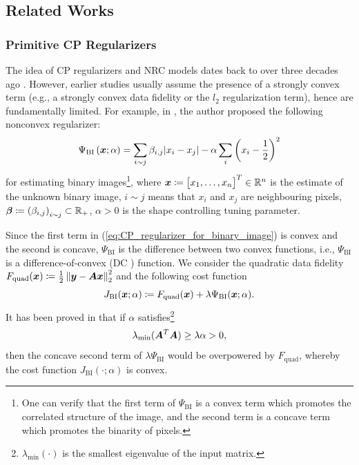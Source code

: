 \documentclass[lettersize,journal]{IEEEtran}
\theoremstyle{plain}%
\theoremstyle{definition}
\theoremstyle{remark}
\begin{document}
\subsection{Related Works}\label{sec:related_works}
\subsubsection{Primitive CP Regularizers} 


The idea of CP regularizers and NRC models dates back to over three decades ago \cite{blake1987,nikolova1998,nikolova1999}. However, earlier studies \cite{blake1987,nikolova1998,nikolova1999,parekh2016,suzuki2021} usually assume the presence of a strongly convex term (e.g., a strongly convex data fidelity or the $l_2$ regularization term), hence are fundamentally limited. For example, in \cite{nikolova1998}, the author proposed the following nonconvex regularizer:
\begin{equation}\label{eq:CP_regularizer_for_binary_image}
\Psi_{\mathrm{BI}}\left( \bm{x};\alpha \right )= \sum_{i\sim j}\beta_{i,j}\lvert x_i-x_j \rvert-\alpha\sum_{i}\left( x_i-\frac{1}{2} \right )^2
\end{equation}
for estimating binary images\footnote{One can verify that the first term of $\Psi_{\mathrm{BI}}$ is a convex term which promotes the correlated structure of the image, and the second term is a concave term which promotes the binarity of pixels.}, where $\bm{x}\coloneqq\begin{bmatrix}x_1,\dots,x_n\end{bmatrix}^T\in\mathbb{R}^n$ is the estimate of the unknown binary image, $i\sim j$ means that $x_i$ and $x_j$ are neighbouring pixels, $\bm{\beta}\coloneqq \left( \beta_{i,j} \right )_{i\sim j}\subset \mathbb{R}_+$, $\alpha>0$ is the shape controlling tuning parameter. 

Since the first term in (\ref{eq:CP_regularizer_for_binary_image}) is convex and the second is concave, $\Psi_{\mathrm{BI}}$ is the difference between two convex functions, i.e., $\Psi_{\mathrm{BI}}$ is a difference-of-convex (DC \cite{le2018}) function. We consider the quadratic data fidelity $F_{\mathrm{quad}}(\bm{x})\coloneqq \frac{1}{2}\left\| \bm{y}-\bm{A}\bm{x} \right\|^2_2$ and the following cost function
\[J_{\mathrm{BI}}(\bm{x};\alpha)\coloneqq F_{\mathrm{quad}}(\bm{x})+\lambda\Psi_{\mathrm{BI}}(\bm{x};\alpha).\]
It has been proved in \cite{nikolova1998} that if $\alpha$ satisfies\footnote{$\lambda_{\min}(\cdot)$ is the smallest eigenvalue of the input matrix.}
\begin{equation}\label{eq:convexity_condition_BI}
\lambda_{\min}(\bm{A}^T\bm{A})\geq \lambda\alpha>0,
\end{equation}
then the concave second term of $\lambda\Psi_{\mathrm{BI}}$ would be overpowered by $F_{\mathrm{quad}}$, whereby the cost function $J_{\mathrm{BI}}(\cdot;\alpha)$ is convex.
\end{document}
